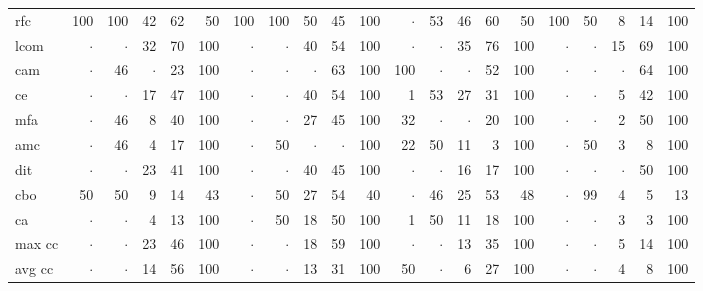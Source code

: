 \begin{figure*}[ht!]
\begin{minipage}{\linewidth}
{\begin{tabular}{l@{~}|r@{~}r|@{~}r@{~}r@{~}r|r@{~}r|r@{~}r@{~}r|r@{~}r|r@{~}r@{~}r|r@{~}r|r@{~}r@{~}r}
    rfc   & 100   & 100   & 42    & 62    & 50    & 100   & 100   & 50    & 45    & 100   & $\cdot$     & 53    & 46    & 60    & 50    & 100   & 50    & 8     & 14    & 100 \bigstrut\\
    lcom  & $\cdot$     & $\cdot$     & 32    & 70    & 100   & $\cdot$     & $\cdot$     & 40    & 54    & 100   & $\cdot$     & $\cdot$     & 35    & 76    & 100   & $\cdot$     & $\cdot$     & 15    & 69    & 100 \bigstrut\\
    cam   & $\cdot$     & 46    & $\cdot$     & 23    & 100   & $\cdot$     & $\cdot$     & $\cdot$     & 63    & 100   & 100   & $\cdot$     & $\cdot$     & 52    & 100   & $\cdot$     & $\cdot$     & $\cdot$     & 64    & 100 \bigstrut\\
    ce    & $\cdot$     & $\cdot$     & 17    & 47    & 100   & $\cdot$     & $\cdot$     & 40    & 54    & 100   & 1     & 53    & 27    & 31    & 100   & $\cdot$     & $\cdot$     & 5     & 42    & 100 \bigstrut\\
    mfa   & $\cdot$     & 46    & 8     & 40    & 100   & $\cdot$     & $\cdot$     & 27    & 45    & 100   & 32    & $\cdot$     & $\cdot$     & 20    & 100   & $\cdot$     & $\cdot$     & 2     & 50    & 100 \bigstrut\\
    amc   & $\cdot$     & 46    & 4     & 17    & 100   & $\cdot$     & 50    & $\cdot$     & $\cdot$     & 100   & 22    & 50    & 11    & 3     & 100   & $\cdot$     & 50    & 3     & 8     & 100 \bigstrut\\
    dit   & $\cdot$     & $\cdot$     & 23    & 41    & 100   & $\cdot$     & $\cdot$     & 40    & 45    & 100   & $\cdot$     & $\cdot$     & 16    & 17    & 100   & $\cdot$     & $\cdot$     & $\cdot$     & 50    & 100 \bigstrut\\
    cbo   & 50    & 50    & 9     & 14    & 43    & $\cdot$     & 50    & 27    & 54    & 40    & $\cdot$     & 46    & 25    & 53    & 48    & $\cdot$     & 99    & 4     & 5     & 13 \bigstrut\\
    ca    & $\cdot$     & $\cdot$     & 4     & 13    & 100   & $\cdot$     & 50    & 18    & 50    & 100   & 1     & 50    & 11    & 18    & 100   & $\cdot$     & $\cdot$     & 3     & 3     & 100 \bigstrut\\
    max cc & $\cdot$     & $\cdot$     & 23    & 46    & 100   & $\cdot$     & $\cdot$     & 18    & 59    & 100   & $\cdot$     & $\cdot$     & 13    & 35    & 100   & $\cdot$     & $\cdot$     & 5     & 14    & 100 \bigstrut\\
    avg cc & $\cdot$     & $\cdot$     & 14    & 56    & 100   & $\cdot$     & $\cdot$     & 13    & 31    & 100   & 50    & $\cdot$     & 6     & 27    & 100   & $\cdot$     & $\cdot$     & 4     & 8     & 100 \bigstrut\\

\end{tabular}}
\end{minipage}
\end{figure*}
